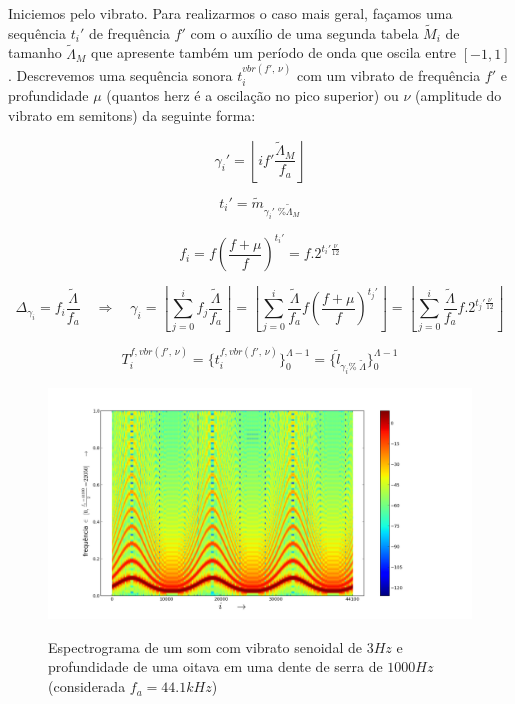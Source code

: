 Iniciemos pelo vibrato. Para realizarmos o caso mais geral, façamos uma sequência $t_i'$
de frequência $f'$ com o auxílio
de uma segunda tabela $\widetilde{M}_i$ de tamanho $\widetilde{\Lambda}_M$ que apresente também
um período de onda que oscila entre $[-1,1]$. Descrevemos uma sequência sonora $t_i^{vbr(f',\,\nu)}$ com
um vibrato de frequência $f'$ e profundidade  $\mu$ (quantos herz é a oscilação no pico superior)
ou $\nu$ (amplitude do vibrato em semitons) da seguinte forma:


\begin{equation}\label{vbrGamma}
\gamma_i'=\left \lfloor i f' \frac{\widetilde{\Lambda}_M}{f_a} \right \rfloor
\end{equation}

\begin{equation}\label{vbrAux}
t_i'=\widetilde{m}_{\gamma_i' \;\% \widetilde{\Lambda}_M}
\end{equation}

\begin{equation}\label{vbrF}
f_i=f \left ( \frac{f + \mu }{f} \right )^{t_i'}=f . 2^{t_i'\frac{\nu}{12}}
\end{equation}

\begin{equation}\label{vbrGamma2}
\Delta_{\gamma_i}=f_i\frac{\widetilde{\Lambda}}{f_a} \quad \Rightarrow \quad \gamma_i = \left \lfloor \sum_{j=0}^{i} f_j \frac{\widetilde{\Lambda}}{f_a} \right \rfloor = \left \lfloor \sum_{j=0}^{i} \frac{\widetilde{\Lambda}}{f_a}f \left ( \frac{f + \mu }{f} \right )^{t_j'}  \right \rfloor= \left \lfloor \sum_{j=0}^{i} \frac{\widetilde{\Lambda}}{f_a}f . 2^{t_j'\frac{\nu}{12}}  \right \rfloor
\end{equation}

\begin{equation}\label{vbrT}
T_i^{f, vbr(f',\,\nu)}=\{ t_i^{f,vbr(f',\,\nu)} \}_0^{\Lambda-1}=\{ \widetilde{l}_{\gamma_i \%\; \widetilde{\Lambda} } \}_0^{\Lambda-1}
\end{equation}


\begin{figure}[h!]
    \centering
    \caption{Espectrograma de um som com vibrato senoidal de $3Hz$ e profundidade de uma oitava em uma dente de serra de $1000Hz$ (considerada $f_a=44.1kHz$)}
        \includegraphics[width=\textwidth]{figuras/vibrato___}
        \label{fig:vibrato}
\end{figure}

